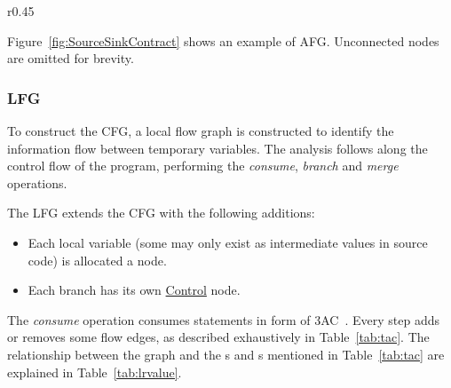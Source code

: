 \begin{wrapfigure}{r}{0.45\textwidth}
	\begin{minipage}{0.45\textwidth}
		\caption{Example \ac{CFG} for Listing~\ref{lst:SourceSinkExample}}
		\begin{center}
		\end{center}
		\label{fig:SourceSinkContract}
	\end{minipage}
\end{wrapfigure}

Figure~\ref{fig:SourceSinkContract} shows an example of \ac{AFG}.
Unconnected nodes are omitted for brevity.

\subsubsection{\acf{LFG}}
To construct the \ac{CFG}, a local flow graph is constructed
to identify the information flow between temporary variables.
The analysis follows along the control flow of the program,
performing the \emph{consume}, \emph{branch} and \emph{merge} operations.

The \ac{LFG} extends the \ac{CFG} with the following additions:
\begin{itemize}
	\item Each local variable (some may only exist as intermediate values in source code)
		is allocated a node.
	\item Each branch has its own \underline{Control} node.
\end{itemize}

The \emph{consume} operation consumes statements in form of \acf{3AC}~\cite{sootsurvivor}.
Every step adds or removes some flow edges,
as described exhaustively in Table~\ref{tab:tac}.
The relationship between the graph and the s and s
mentioned in Table~\ref{tab:tac} are explained in Table~\ref{tab:lrvalue}.

